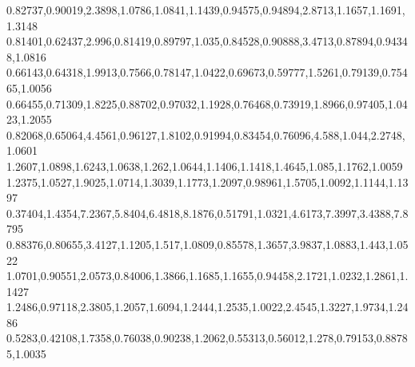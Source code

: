 0.82737,0.90019,2.3898,1.0786,1.0841,1.1439,0.94575,0.94894,2.8713,1.1657,1.1691,1.3148
0.81401,0.62437,2.996,0.81419,0.89797,1.035,0.84528,0.90888,3.4713,0.87894,0.94348,1.0816
0.66143,0.64318,1.9913,0.7566,0.78147,1.0422,0.69673,0.59777,1.5261,0.79139,0.75465,1.0056
0.66455,0.71309,1.8225,0.88702,0.97032,1.1928,0.76468,0.73919,1.8966,0.97405,1.0423,1.2055
0.82068,0.65064,4.4561,0.96127,1.8102,0.91994,0.83454,0.76096,4.588,1.044,2.2748,1.0601
1.2607,1.0898,1.6243,1.0638,1.262,1.0644,1.1406,1.1418,1.4645,1.085,1.1762,1.0059
1.2375,1.0527,1.9025,1.0714,1.3039,1.1773,1.2097,0.98961,1.5705,1.0092,1.1144,1.1397
0.37404,1.4354,7.2367,5.8404,6.4818,8.1876,0.51791,1.0321,4.6173,7.3997,3.4388,7.8795
0.88376,0.80655,3.4127,1.1205,1.517,1.0809,0.85578,1.3657,3.9837,1.0883,1.443,1.0522
1.0701,0.90551,2.0573,0.84006,1.3866,1.1685,1.1655,0.94458,2.1721,1.0232,1.2861,1.1427
1.2486,0.97118,2.3805,1.2057,1.6094,1.2444,1.2535,1.0022,2.4545,1.3227,1.9734,1.2486
0.5283,0.42108,1.7358,0.76038,0.90238,1.2062,0.55313,0.56012,1.278,0.79153,0.88785,1.0035

